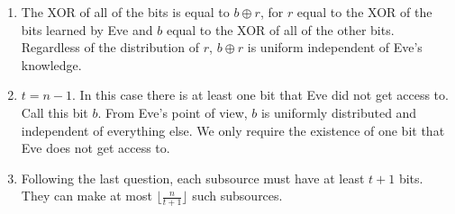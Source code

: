 \documentclass[12pt]{article}
\begin{document}
\begin{enumerate}
\begin{enumerate}
\item The XOR of all of the bits is equal to $b\oplus r$, for $r$ equal to the XOR of the bits learned by Eve and $b$ equal to the XOR of all of the other bits. Regardless of the distribution of $r$, $b\oplus r$ is uniform independent of Eve's knowledge.

\item $t=n-1$. In this case there is at least one bit that Eve did not get access to. Call this bit $b$. From Eve's point of view, $b$ is uniformly distributed and independent of everything else. We only require the existence of one bit that Eve does not get access to.

\item Following the last question, each subsource must have at least $t+1$ bits. They can make at most $\lfloor \frac{n}{t+1}\rfloor$ such subsources.
\end{enumerate}

\end{enumerate}
\end{document}
